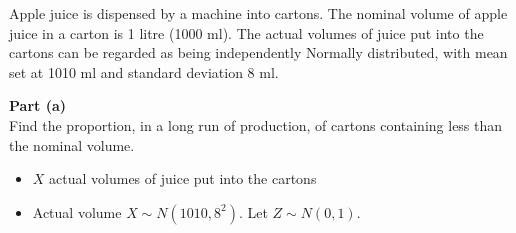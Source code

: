 \documentclass[a4paper,12pt]{article}
\begin{document}
\large
\begin{framed}
\large
\noindent Apple juice is dispensed by a machine into cartons.  The nominal volume of apple juice in a carton is 1 litre (1000 ml).  The actual volumes of juice put into the cartons can be regarded as being independently Normally distributed, with mean set at 1010 ml and standard deviation 8 ml. \\ \medskip

\noindent \textbf{Part (a)}\\
\noindent Find the proportion, in a long run of production, of cartons containing less than the nominal volume. 
\end{framed} 

\begin{itemize}
    \item $X$ actual volumes of juice put into the cartons
    \item Actual volume $X \sim N(1010, 8^2)$. Let $Z \sim N(0,1)$.
\end{itemize}
\end{document}
